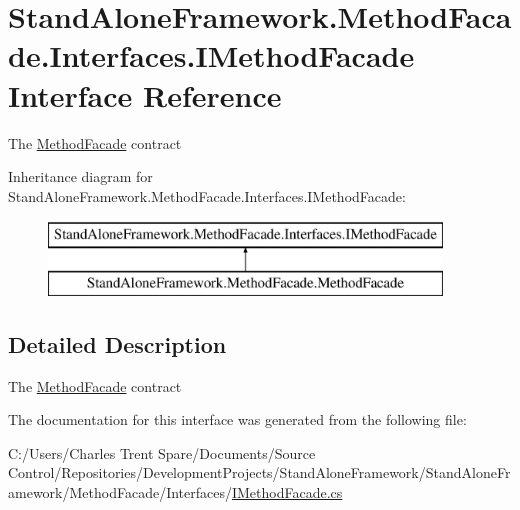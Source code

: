 \hypertarget{interface_stand_alone_framework_1_1_method_facade_1_1_interfaces_1_1_i_method_facade}{\section{Stand\+Alone\+Framework.\+Method\+Facade.\+Interfaces.\+I\+Method\+Facade Interface Reference}
\label{interface_stand_alone_framework_1_1_method_facade_1_1_interfaces_1_1_i_method_facade}
}


The \hyperlink{class_stand_alone_framework_1_1_method_facade_1_1_method_facade}{Method\+Facade} contract  


Inheritance diagram for Stand\+Alone\+Framework.\+Method\+Facade.\+Interfaces.\+I\+Method\+Facade\+:\begin{figure}[H]
\begin{center}
\leavevmode
\includegraphics[height=2.000000cm]{interface_stand_alone_framework_1_1_method_facade_1_1_interfaces_1_1_i_method_facade}
\end{center}
\end{figure}


\subsection{Detailed Description}
The \hyperlink{class_stand_alone_framework_1_1_method_facade_1_1_method_facade}{Method\+Facade} contract 



The documentation for this interface was generated from the following file\+:\begin{DoxyCompactItemize}
\item 
C\+:/\+Users/\+Charles Trent Spare/\+Documents/\+Source Control/\+Repositories/\+Development\+Projects/\+Stand\+Alone\+Framework/\+Stand\+Alone\+Framework/\+Method\+Facade/\+Interfaces/\hyperlink{_i_method_facade_8cs}{I\+Method\+Facade.\+cs}\end{DoxyCompactItemize}
